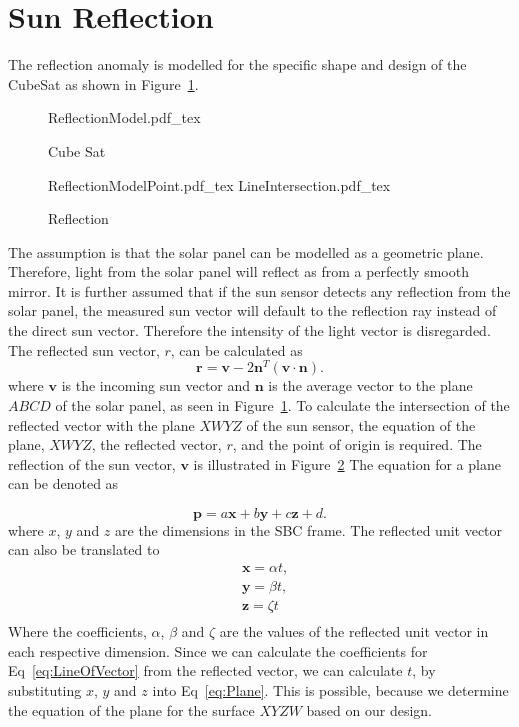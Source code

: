 \documentclass[letterpaper, 10 pt, conference]{ieeeconf}  %
\begin{document}
\section{Sun Reflection}
\label{section:Reflection}
The reflection anomaly is modelled for the specific shape and design of the CubeSat as shown in Figure~\ref{fig:CubeSat}.

\begin{figure}[!htb]
	\centering
	\def\svgwidth{7cm}
	{ReflectionModel.pdf_tex}
	\caption{Cube Sat}
	\label{fig:CubeSat}
\end{figure}

\begin{figure}[!hbt]
	\centering
	\def\svgwidth{7cm}
	{ReflectionModelPoint.pdf_tex}
	\centering
	\def\svgwidth{7cm}
	{LineIntersection.pdf_tex}
	\caption{Reflection}
	\label{fig:LineIntersection}
\end{figure}

The assumption is that the solar panel can be modelled as a geometric plane. Therefore, light from the solar panel will reflect as from a perfectly smooth mirror. It is further assumed that if the sun sensor detects any reflection from the solar panel, the measured sun vector will default to the reflection ray instead of the direct sun vector. Therefore the intensity of the light vector is disregarded. The reflected sun vector, $r$, can be calculated as
\begin{equation}
\mathbf{r} = \mathbf{v} - 2\mathbf{n}^T(\mathbf{v} \cdot \mathbf{n}).
\end{equation}
where $\mathbf{v}$ is the incoming sun vector and $\mathbf{n}$ is the average vector to the plane $ABCD$ of the solar panel, as seen in Figure~\ref{fig:CubeSat}. To calculate the intersection of the reflected vector with the plane $XWYZ$ of the sun sensor, the equation of the plane, $XWYZ$, the reflected vector, $r$, and the point of origin is required. The reflection of the sun vector, $\mathbf{v}$ is illustrated in Figure~\ref{fig:LineIntersection} The equation for a plane can be denoted as

\begin{equation}
\mathbf{p} = a\mathbf{x} + b\mathbf{y} + c\mathbf{z} + d.
\label{eq:Plane}
\end{equation}
where $x$, $y$ and $z$ are the dimensions in the SBC frame. The reflected unit vector can also be translated to 
\begin{equation}
\begin{aligned}
&	\mathbf{x} = \alpha t, \\
&	\mathbf{y} = \beta t, \\
&	\mathbf{z} = \zeta t \\
\end{aligned}
\label{eq:LineOfVector}
\end{equation}
Where the coefficients, $\alpha$, $\beta$ and $\zeta$ are the values of the reflected unit vector in each respective dimension. Since we can calculate the coefficients for Eq~\ref{eq:LineOfVector} from the reflected vector, we can calculate $t$, by substituting $x$, $y$ and $z$ into Eq~\ref{eq:Plane}. This is possible, because we determine the equation of the plane for the surface $XYZW$ based on our design. 
\end{document}
